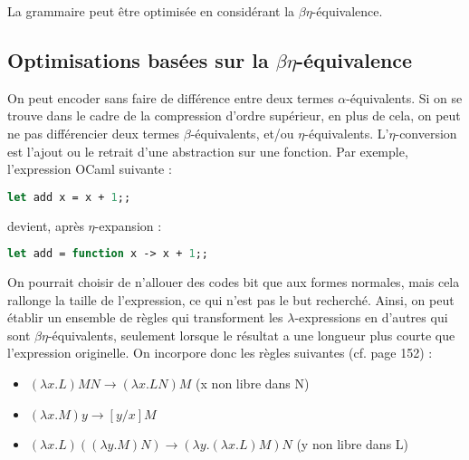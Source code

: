 \documentclass[titlepage]{article}
\begin{document}
La grammaire peut être optimisée en considérant la $\beta\eta$-équivalence.

\subsection{Optimisations basées sur la $\beta\eta$-équivalence}
On peut encoder sans faire de différence entre deux termes $\alpha$-équivalents. Si on se trouve dans le cadre de la compression d'ordre supérieur, en plus de cela, on peut ne pas différencier deux termes $\beta$-équivalents, et/ou $\eta$-équivalents. L'$\eta$-conversion est l'ajout ou le retrait d'une abstraction sur une fonction. Par exemple, l'expression OCaml suivante :
\begin{lstlisting}[language=Caml]
let add x = x + 1;;
\end{lstlisting} 
devient, après $\eta$-expansion :
\begin{lstlisting}[language=Caml]
let add = function x -> x + 1;;
\end{lstlisting} 

On pourrait choisir de n'allouer des codes bit que aux formes normales, mais cela rallonge la taille de l'expression, ce qui n'est pas le but recherché. Ainsi, on peut établir un ensemble de règles qui transforment les $\lambda$-expressions en d'autres qui sont $\beta\eta$-équivalents, seulement lorsque le résultat a une longueur plus courte que l'expression originelle. On incorpore donc les règles suivantes (cf. page 152) :

\begin{itemize}  
\item $(\lambda x.L)M N \to (\lambda x.L N)M$ (x non libre dans N)
\item $(\lambda x.M) y \to [y/x]M$
\item $(\lambda x.L)((\lambda y.M)N) \to (\lambda y.(\lambda x.L)M)N$ (y non libre dans L)
\end{itemize}
\end{document}
